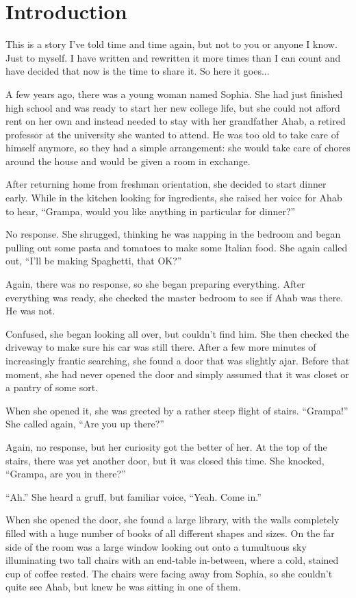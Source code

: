\chapter{Introduction}

This is a story I've told time and time again, but not to you or anyone I know.
Just to myself.
I have written and rewritten it more times than I can count and have decided that now is the time to share it.
So here it goes...

A few years ago, there was a young woman named Sophia.
She had just finished high school and was ready to start her new college life, but she could not afford rent on her own and instead needed to stay with her grandfather Ahab, a retired professor at the university she wanted to attend.
He was too old to take care of himself anymore, so they had a simple arrangement: she would take care of chores around the house and would be given a room in exchange.

After returning home from freshman orientation, she decided to start dinner early.
While in the kitchen looking for ingredients, she raised her voice for Ahab to hear, ``Grampa, would you like anything in particular for dinner?''

No response.
She shrugged, thinking he was napping in the bedroom and began pulling out some pasta and tomatoes to make some Italian food.
She again called out, ``I'll be making Spaghetti, that OK?''

Again, there was no response, so she began preparing everything.
After everything was ready, she checked the master bedroom to see if Ahab was there.
He was not.

Confused, she began looking all over, but couldn't find him.
She then checked the driveway to make sure his car was still there.
After a few more minutes of increasingly frantic searching, she found a door that was slightly ajar.
Before that moment, she had never opened the door and simply assumed that it was closet or a pantry of some sort.

When she opened it, she was greeted by a rather steep flight of stairs. ``Grampa!'' She called again, ``Are you up there?''

Again, no response, but her curiosity got the better of her.
At the top of the stairs, there was yet another door, but it was closed this time.
She knocked, ``Grampa, are you in there?''

``Ah.'' She heard a gruff, but familiar voice, ``Yeah. Come in.''

When she opened the door, she found a large library, with the walls completely filled with a huge number of books of all different shapes and sizes.
On the far side of the room was a large window looking out onto a tumultuous sky illuminating two tall chairs with an end-table in-between, where a cold, stained cup of coffee rested.
The chairs were facing away from Sophia, so she couldn't quite see Ahab, but knew he was sitting in one of them.

